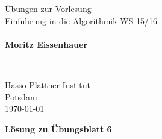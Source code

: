 \documentclass{scrartcl}
\begin{document}
\pagestyle{plain}


\noindent
\begin{minipage}{0.66\textwidth}
Übungen zur Vorlesung\\
Einführung in die Algorithmik WS 15/16\\
~\\
\textbf{Moritz Eissenhauer}
\end{minipage}
~
\begin{minipage}{0.30\textwidth}
Hasso-Plattner-Institut\\
Potsdam\\
\today
\end{minipage}


\begin{center}
 \huge \bf Lösung zu Übungsblatt 6
\end{center}
\end{document}
